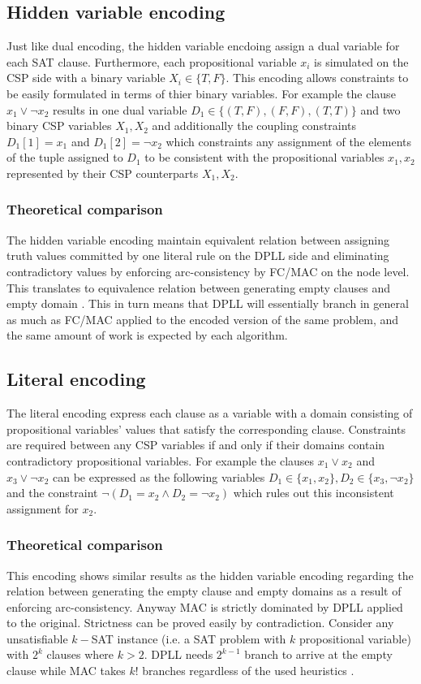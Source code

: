 \subsection{Hidden variable encoding}
Just like dual encoding, the hidden variable encdoing assign a dual variable for each SAT clause. Furthermore, each propositional variable $x_i$ is simulated on the CSP side with a binary variable $X_i \in \{T,F\}$. This encoding allows constraints to be easily formulated in terms of thier binary variables. For example the clause $x_1 \vee \neg x_2$ results in one dual variable $D_1 \in \{(T,F),(F,F),(T,T)\}$ and two binary CSP variables $X_1, X_2$ and additionally the coupling constraints $D_1[1] = x_1$ and $D_1[2] = \neg x_2$ which constraints any assignment of the elements of the tuple assigned to $D_1$ to be consistent with the propositional variables $x_1,x_2$ represented by their CSP counterparts $X_1,X_2$.

\subsubsection{Theoretical comparison}
The hidden variable encoding maintain equivalent relation between assigning truth values committed by one literal rule on the DPLL side and eliminating contradictory values by enforcing arc-consistency by FC/MAC on the node level. This translates to equivalence relation between generating empty clauses and empty domain \cite{walsh2000sat}. This in turn means that DPLL will essentially branch in general as much as FC/MAC applied to the encoded version of the same problem, and the same amount of work is expected by each algorithm.

\subsection{Literal encoding}
The literal encoding express each clause as a variable with a domain consisting of propositional variables' values that satisfy the corresponding clause. Constraints are required between any CSP variables if and only if their domains contain contradictory propositional variables. For example the clauses $x_1 \vee x_2$ and $x_3 \vee \neg x_2$ can be expressed as the following variables $D_1 \in \{x_1, x_2\}, D_2 \in \{x_3, \neg x_2\}$ and the constraint $\neg (D_1 = x_2 \wedge D_2 = \neg x_2)$ which rules out this inconsistent assignment for $x_2$.

\subsubsection{Theoretical comparison}
This encoding shows similar results as the hidden variable encoding regarding the relation between generating the empty clause and empty domains as a result of enforcing arc-consistency. Anyway MAC is strictly dominated by DPLL applied to the original. Strictness can be proved easily by contradiction. Consider any unsatisfiable $k-$SAT instance (i.e. a SAT problem with $k$ propositional variable) with $2^k$ clauses where $k > 2$. DPLL needs $2^{k-1}$ branch to arrive at the empty clause while MAC takes $k!$ branches regardless of the used heuristics \cite{walsh2000sat}.

